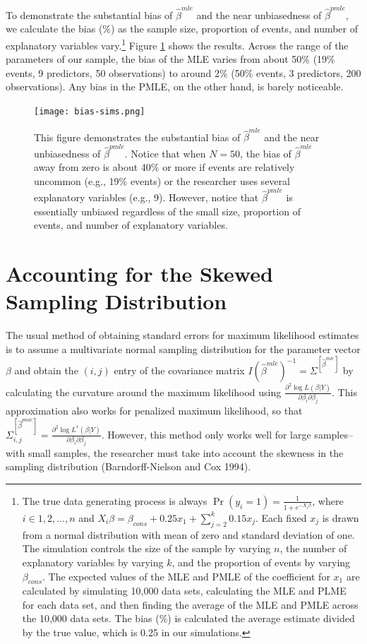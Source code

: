 \documentclass[12pt]{article}
\begin{document}
To demonstrate the substantial bias of $\hat{\beta}^{mle}$ and the near unbiasedness of $\hat{\beta}^{pmle}$, we calculate the bias (\%) as the sample size, proportion of events, and number of explanatory variables vary.\footnote{The true data generating process is always $\Pr(y_i = 1) = \frac{1}{1 + e^{-X_i \beta}}$, where $i \in 1, 2,..., n$ and $X_i \beta = \beta_{cons} + 0.25 x_1 + \sum_{j = 2}^k 0.15 x_j$. Each fixed $x_j$ is drawn from a normal distribution with mean of zero and standard deviation of one. The simulation controls the size of the sample by varying $n$, the number of explanatory variables by varying $k$, and the proportion of events by varying $\beta_{cons}$. The expected values of the MLE  and PMLE of the coefficient for $x_1$ are calculated by simulating 10,000 data sets, calculating the MLE and PLME for each data set, and then finding the average of the MLE and PMLE across the 10,000 data sets. The bias (\%) is calculated the average estimate divided by the true value, which is 0.25 in our simulations.} Figure \ref{fig:bias-sims} shows the results. Across the range of the parameters of our sample, the bias of the MLE varies from about 50\% (19\% events, 9 predictors, 50 observations) to around 2\% (50\% events, 3 predictors, 200 observations). Any bias in the PMLE, on the other hand, is barely noticeable.

\begin{figure}[H]
\begin{center}
\texttt{[image: bias-sims.png]}
\caption{This figure demonstrates the substantial bias of $\hat{\beta}^{mle}$ and the near unbiasedness of $\hat{\beta}^{pmle}$. Notice that when $N = 50$, the bias of $\hat{\beta}^{mle}$ away from zero is about 40\% or more if events are relatively uncommon (e.g., 19\% events) or the researcher uses several explanatory variables (e.g., 9). However, notice that $\hat{\beta}^{pmle}$ is essentially unbiased regardless of the small size, proportion of events, and number of explanatory variables.}\label{fig:bias-sims}
\end{center}
\end{figure}

\section*{Accounting for the Skewed Sampling Distribution}

The usual method of obtaining standard errors for maximum likelihood estimates is to assume a multivariate normal sampling distribution for the parameter vector $\beta$ and obtain the $(i, j)$ entry of the covariance matrix $I(\hat{\beta}^{mle})^{-1} = \Sigma^{[\hat{\beta}^{mle}]}$ by calculating the curvature around the maximum likelihood using $\frac{\partial^2 \log L(\beta | Y)}{\partial \beta_i \partial \beta_j}$. This approximation also works for penalized maximum likelihood, so that $\Sigma^{[\hat{\beta}^{pmle}]}_{i,j} = \frac{\partial^2 \log L^*(\beta | Y)}{\partial \beta_i \partial \beta_j}$. However, this method only works well for large samples--with small samples, the researcher must take into account the skewness in the sampling distribution (Barndorff-Nielson and Cox 1994).
\end{document}
